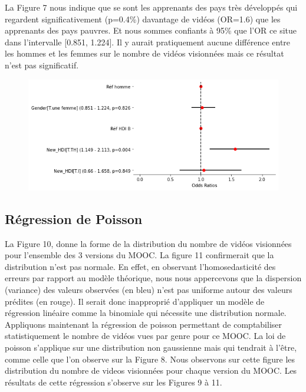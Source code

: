 \documentclass[12pt, a4paper, titlepage, table]{article}
\begin{document}
La Figure 7 nous indique que se sont les apprenants des pays très développés qui regardent significativement (p=0.4\%) davantage de vidéos (OR=1.6) que les apprenants des pays pauvres.  Et nous sommes confiants à 95\% que l'OR ce situe dans l'intervalle [0.851, 1.224].   
Il y aurait pratiquement aucune différence entre les hommes et les femmes sur le nombre de vidéos visionnées mais ce résultat n'est pas significatif.

\begin{figure}[H]
	\centering
	\includegraphics[width=1\textwidth]{../../graph/forestplot_V1_binomiale.png}
\end{figure}



\subsection{Régression de Poisson}
La Figure 10, donne la forme de la distribution du nombre de vidéos visionnées pour l'ensemble des 3 versions du MOOC.
La figure 11 confirmerait que la distribution n'est pas normale. En effet, en observant l'homosedasticité des erreurs par 
rapport au modèle théorique, nous nous appercevons que la dispersion (variance) des valeurs observées (en bleu)
n'est pas uniforme autour des valeurs prédites (en rouge). 
Il serait donc inapproprié d'appliquer un modèle de régression linéaire comme la binomiale qui nécessite une distribution normale.
Appliquons maintenant la régression de poisson permettant de comptabiliser statistiquement le nombre de vidéos vues par
genre pour ce MOOC. La loi de poisson s'applique sur une distribution non gaussienne mais qui tendrait à l'être, comme celle que l'on
observe sur la Figure 8. Nous observons sur cette figure les distribution du nombre de videos visionnées pour chaque version du MOOC.
Les résultats de cette régression s'observe sur les Figures 9 à 11.
\end{document}
